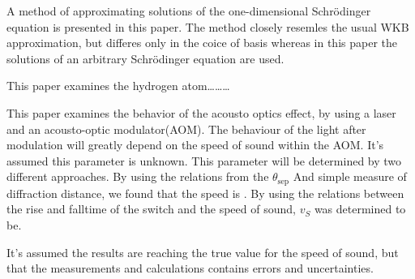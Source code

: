 A method of approximating solutions of the one-dimensional Schrödinger equation is presented in this paper. The method closely resemles the usual WKB approximation, but differes only in the coice of basis whereas in this paper the solutions of an arbitrary Schrödinger equation are used.

This paper examines the hydrogen atom\ldots\ldots\ldots




This paper examines the behavior of the acousto optics effect, by using a  laser and an acousto-optic modulator(AOM). The behaviour of the light after modulation will greatly depend on the speed of sound within the AOM. It’s assumed this parameter is unknown. This parameter will be determined by two different approaches. By using the relations from the $\theta_{\text{sep}}$ And simple measure of diffraction distance, we found that the speed is . By using the relations between the rise and falltime of the switch and the speed of sound, $v_S$ was determined to be.

 It’s assumed the results are reaching the true value for the speed of sound, but that the measurements and calculations contains errors and uncertainties.


